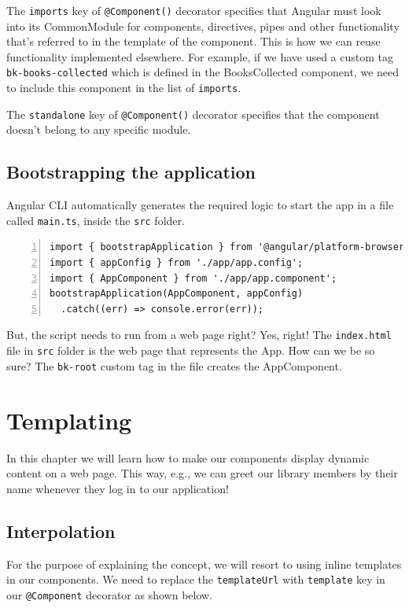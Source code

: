 \documentclass{report}
\begin{document}
The \verb|imports| key of \verb|@Component()| decorator specifies that Angular must look into its CommonModule for components, directives, pipes and other functionality that's referred to in the template of the component. This is how we can reuse functionality implemented elsewhere. For example, if we have used a custom tag \verb|bk-books-collected| which is defined in the BooksCollected component, we need to include this component in the list of \verb|imports|.

The \verb|standalone| key of \verb|@Component()| decorator specifies that the component doesn't belong to any specific module.

\section{Bootstrapping the application}
Angular CLI automatically generates the required logic to start the app in a file called \verb|main.ts|, inside the \verb|src| folder.

\begin{Verbatim}[numbers=left]
import { bootstrapApplication } from '@angular/platform-browser';
import { appConfig } from './app/app.config';
import { AppComponent } from './app/app.component';
bootstrapApplication(AppComponent, appConfig)
  .catch((err) => console.error(err));
\end{Verbatim}

But, the script needs to run from a web page right? Yes, right! The \verb|index.html| file in \verb|src| folder is the web page that represents the App. How can we be so sure? The \verb|bk-root| custom tag in the file creates the AppComponent.

\chapter{Templating}
In this chapter we will learn how to make our components display dynamic content on a web page. This way, e.g., we can greet our library members by their name whenever they log in to our application!

\section{Interpolation}
For the purpose of explaining the concept, we will resort to using inline templates in our components. We need to replace the \verb|templateUrl| with \verb|template| key in our \verb|@Component| decorator as shown below.
 
\end{document}
